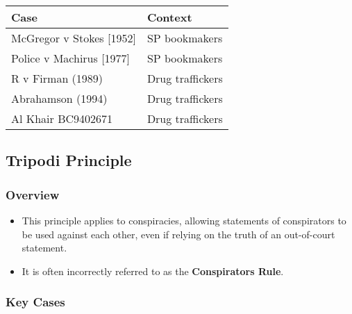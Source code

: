 \begin{longtable}[]{@{}
  >{\raggedright\arraybackslash}p{}
  >{\raggedright\arraybackslash}p{}@{}}
\toprule\noalign{}
\begin{minipage}[b]{\linewidth}\raggedright
Case
\end{minipage} & \begin{minipage}[b]{\linewidth}\raggedright
Context
\end{minipage} \\
\midrule\noalign{}
\endhead
\bottomrule\noalign{}
\endlastfoot
McGregor v Stokes {[}1952{]} & SP bookmakers \\
Police v Machirus {[}1977{]} & SP bookmakers \\
R v Firman (1989) & Drug traffickers \\
Abrahamson (1994) & Drug traffickers \\
Al Khair BC9402671 & Drug traffickers \\
\end{longtable}

\subsection{  Tripodi Principle}\label{tripodi-principle}

\subsubsection{Overview}\label{overview}

\begin{itemize}
\tightlist
\item
  This principle applies to conspiracies, allowing statements of
  conspirators to be used against each other, even if relying on the
  truth of an out-of-court statement.
\item
  It is often incorrectly referred to as the \textbf{Conspirators Rule}.
\end{itemize}

\subsubsection{Key Cases}\label{key-cases-2}

